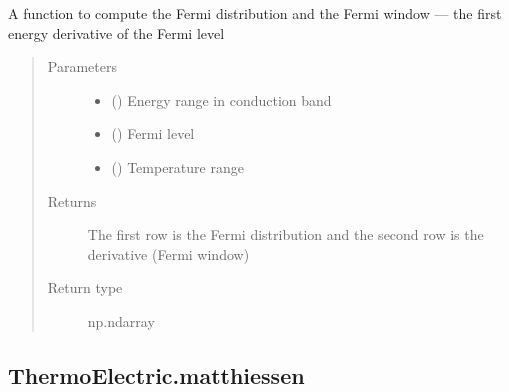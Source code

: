 \documentclass[letterpaper,10pt,english]{sphinxmanual}
\begin{document}
\begin{fulllineitems}
\label{\detokenize{autosummary/ThermoElectric.fermi_distribution:ThermoElectric.fermi_distribution}}
\sphinxAtStartPar
A function to compute the Fermi distribution and
the Fermi window — the first energy derivative of the Fermi level
\begin{quote}\begin{description}
\item[{Parameters}] \leavevmode\begin{itemize}
\item {} 
\sphinxAtStartPar
{} () \textendash{} Energy range in conduction band

\item {} 
\sphinxAtStartPar
{} () \textendash{} Fermi level

\item {} 
\sphinxAtStartPar
{} () \textendash{} Temperature range

\end{itemize}

\item[{Returns}] \leavevmode
\sphinxAtStartPar
{} \textendash{} The first row is the Fermi distribution and the second row is the derivative (Fermi window)

\item[{Return type}] \leavevmode
\sphinxAtStartPar
np.ndarray

\end{description}\end{quote}

\end{fulllineitems}



\subsection{ThermoElectric.matthiessen}
\label{\detokenize{autosummary/ThermoElectric.matthiessen:thermoelectric-matthiessen}}\label{\detokenize{autosummary/ThermoElectric.matthiessen::doc}}
\end{document}
